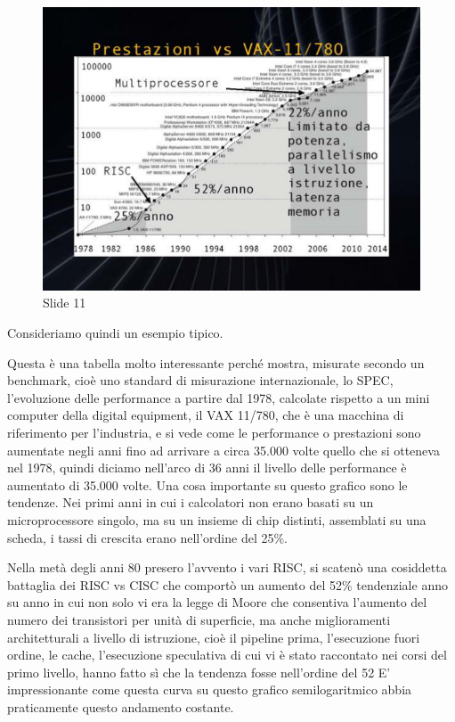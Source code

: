 \begin{figure}[ht]
    \centering
    \includegraphics[width=0.8\linewidth]{images/Lez01_p02_fig_05.png}
    \caption{Slide 11}
    \label{fig:slide_11}
\end{figure}


Consideriamo quindi un esempio tipico.

Questa è una tabella molto interessante perché mostra, misurate secondo un benchmark, cioè uno standard di misurazione internazionale, lo SPEC, l'evoluzione delle performance a partire dal 1978, calcolate rispetto a un mini computer della digital equipment, il VAX 11/780, che è una macchina di riferimento per l'industria, e si vede come le performance o prestazioni sono aumentate negli anni fino ad arrivare a circa 35.000 volte quello che si otteneva nel 1978, quindi diciamo nell'arco di 36 anni il livello delle performance è aumentato di 35.000 volte.
Una cosa importante su questo grafico sono le tendenze.
Nei primi anni in cui i calcolatori non erano basati su un microprocessore singolo, ma su un insieme di chip distinti, assemblati su una scheda, i tassi di crescita erano nell'ordine del 25\%.

Nella metà degli anni 80 presero l'avvento i vari RISC, si scatenò una cosiddetta battaglia dei RISC vs CISC che comportò un aumento del 52\% tendenziale anno su anno in cui non solo vi era la legge di Moore che consentiva l'aumento del numero dei transistori per unità di superficie, ma anche miglioramenti architetturali a livello di istruzione, cioè il pipeline prima, l'esecuzione fuori ordine, le cache, l'esecuzione speculativa di cui vi è stato raccontato nei corsi del primo livello, hanno fatto sì che la tendenza fosse nell'ordine del 52%
E' impressionante come questa curva su questo grafico semilogaritmico abbia praticamente questo andamento costante.

